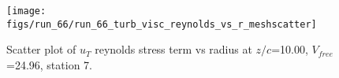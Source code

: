 \begin{figure}[H]
\centering
\texttt{[image: figs/run\_66/run\_66\_turb\_visc\_reynolds\_vs\_r\_meshscatter]}
\caption{Scatter plot of $
u_T$ reynolds stress term vs radius at $z/c$=10.00, $V_{free}$=24.96, station 7.}
\label{fig:run_66_turb_visc_reynolds_vs_r_meshscatter}
\end{figure}


